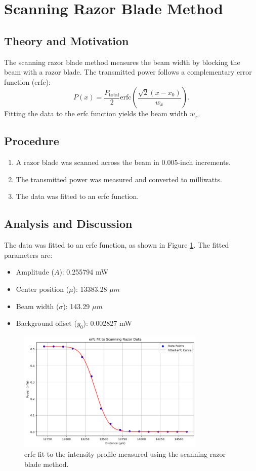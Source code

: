 \documentclass[12pt]{article}
\begin{document}
\section{Scanning Razor Blade Method}

\subsection{Theory and Motivation}
The scanning razor blade method measures the beam width by blocking the beam with a razor blade. The transmitted power follows a complementary error function (erfc):
\[
P(x) = \frac{P_{\text{total}}}{2} \text{erfc}\left(\frac{\sqrt{2}(x - x_0)}{w_x}\right).
\]
Fitting the data to the erfc function yields the beam width \( w_x \).

\subsection{Procedure}
\begin{enumerate}
    \item A razor blade was scanned across the beam in 0.005-inch increments.
    \item The transmitted power was measured and converted to milliwatts.
    \item The data was fitted to an erfc function.
\end{enumerate}

\subsection{Analysis and Discussion}
The data was fitted to an erfc function, as shown in Figure \ref{fig:erfc_fit}. The fitted parameters are:
\begin{itemize}
    \item Amplitude (\( A \)): 0.255794 mW
    \item Center position (\( \mu \)): 13383.28 \(\mu m\)
    \item Beam width (\( \sigma \)): 143.29 \(\mu m\)
    \item Background offset (\( y_0 \)): 0.002827 mW
\end{itemize}

\begin{figure}[h!]
    \centering
    \includegraphics[width=0.8\textwidth]{output2.png}
    \caption{erfc fit to the intensity profile measured using the scanning razor blade method.}
    \label{fig:erfc_fit}
\end{figure}
\end{document}

